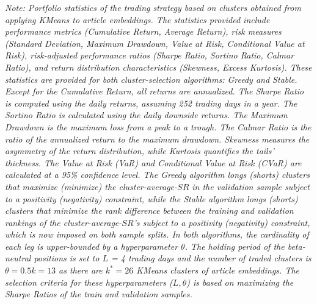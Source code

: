 \documentclass[12pt,article]{memoir}
\begin{document}
\begin{landscape}
\begin{table}[H]
\begin{minipage}{\textwidth}
\scriptsize\textit{Note: 
Portfolio statistics of the trading strategy based on clusters obtained from applying KMeans to article embeddings. 
The statistics provided include performance metrics (Cumulative Return, Average Return), risk measures (Standard Deviation, Maximum Drawdown, Value at Risk, Conditional Value at Risk), risk-adjusted performance ratios (Sharpe Ratio, Sortino Ratio, Calmar Ratio), and return distribution characteristics (Skewness, Excess Kurtosis). These statistics are provided for both cluster-selection algorithms: Greedy and Stable. 
Except for the Cumulative Return, all returns are annualized. The Sharpe Ratio is computed using the daily returns, assuming 252 trading days in a year. The Sortino Ratio is calculated using the daily downside returns. The Maximum Drawdown is the maximum loss from a peak to a trough. The Calmar Ratio is the ratio of the annualized return to the maximum drawdown. Skewness measures the asymmetry of the return distribution, while Kurtosis quantifies the tails' thickness. The Value at Risk (VaR) and Conditional Value at Risk (CVaR) are calculated at a 95\% confidence level.
The Greedy algorithm longs (shorts) clusters that maximize (minimize) the cluster-average-$SR$ in the validation sample subject to a positivity (negativity) constraint, while the Stable algorithm longs (shorts) clusters that minimize the rank difference between the training and validation rankings of the cluster-average-$SR$'s subject to a positivity (negativity) constraint, which is now imposed on both sample splits. In both algorithms, the cardinality of each leg is upper-bounded by a hyperparameter $\theta$. 
The holding period of the beta-neutral positions is set to $L$ = 4 trading days and the number of traded clusters is $\theta = 0.5k=13$ as there are $k^*=26$ KMeans clusters of article embeddings. The selection criteria for these hyperparameters ($L,\theta$) is based on maximizing the Sharpe Ratios of the train and validation samples.
}
\end{minipage}
\end{table}
\end{landscape}
\end{document}
